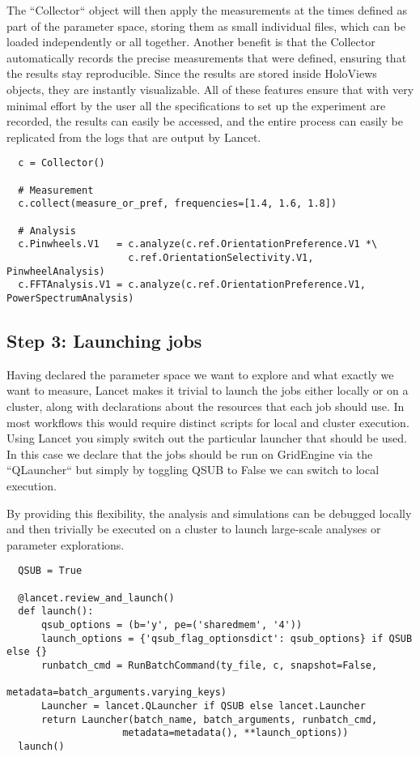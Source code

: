 The ``Collector`` object will then apply the measurements at the times
defined as part of the parameter space, storing them as small
individual files, which can be loaded independently or all
together. Another benefit is that the Collector automatically records
the precise measurements that were defined, ensuring that the results
stay reproducible. Since the results are stored inside HoloViews
objects, they are instantly visualizable. All of these features ensure
that with very minimal effort by the user all the specifications to
set up the experiment are recorded, the results can easily be accessed,
and the entire process can easily be replicated from the logs that are
output by Lancet.


\begin{minipage}{\linewidth}
\begin{lstlisting}
  c = Collector()

  # Measurement
  c.collect(measure_or_pref, frequencies=[1.4, 1.6, 1.8])

  # Analysis
  c.Pinwheels.V1   = c.analyze(c.ref.OrientationPreference.V1 *\
                     c.ref.OrientationSelectivity.V1, PinwheelAnalysis)
  c.FFTAnalysis.V1 = c.analyze(c.ref.OrientationPreference.V1, PowerSpectrumAnalysis)
\end{lstlisting}
\end{minipage}

\subsection{Step 3: Launching jobs}

Having declared the parameter space we want to explore and what
exactly we want to measure, Lancet makes it trivial to launch the jobs
either locally or on a cluster, along with declarations about the
resources that each job should use. In most workflows this would
require distinct scripts for local and cluster execution. Using Lancet
you simply switch out the particular launcher that should be used. In
this case we declare that the jobs should be run on GridEngine via the
``QLauncher`` but simply by toggling QSUB to False we can switch to
local execution.

By providing this flexibility, the analysis and simulations can be
debugged locally and then trivially be executed on a cluster to launch
large-scale analyses or parameter explorations.

\begin{minipage}{\linewidth}
\begin{lstlisting}
  QSUB = True

  @lancet.review_and_launch()
  def launch():
      qsub_options = (b='y', pe=('sharedmem', '4'))
      launch_options = {'qsub_flag_optionsdict': qsub_options} if QSUB else {}
      runbatch_cmd = RunBatchCommand(ty_file, c, snapshot=False,
                                     metadata=batch_arguments.varying_keys)
      Launcher = lancet.QLauncher if QSUB else lancet.Launcher
      return Launcher(batch_name, batch_arguments, runbatch_cmd,
                    metadata=metadata(), **launch_options))
  launch()
\end{lstlisting}
\end{minipage}

